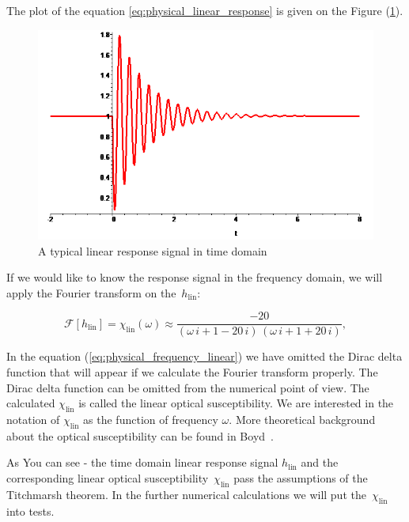 \documentclass[12pt,twoside,a4paper]{article}
\numberwithin{equation}{subsection}
\numberwithin{figure}{subsection}
\begin{document}
The plot of the equation \ref{eq:physical_linear_response} is given on the Figure (\ref{fig:physical_linplot}).

\begin{figure}[H]
  \includegraphics[width=150mm]{img/lin_plot.png}
  \caption{A typical linear response signal in time domain \label{fig:physical_linplot}}
\end{figure}

If we would like to know the response signal in the frequency domain, we will apply the Fourier transform on the~$ h_{\text{lin}} $:

\begin{equation} \label{eq:physical_frequency_linear}
  \mathcal{F}[h_{\text{lin}}] = \chi_{\text{lin}}(\omega) \approx \frac{ -20}{(\omega \,i + 1 -20\,i)\,(\omega \,i + 1 + 20\,i)},
\end{equation}

In the equation (\ref{eq:physical_frequency_linear}) we have omitted the Dirac delta function that will appear if we calculate the Fourier
transform properly. The Dirac delta function can be omitted from the numerical point of view. The calculated $ \chi_{\text{lin}} $
is called the linear optical susceptibility. We are interested in the notation of $ \chi_{\text{lin}} $ as the function of frequency
$ \omega $. More theoretical background about the optical susceptibility can be found in Boyd~\cite{boyd_nlo}. 

As You can see - the time domain linear response signal $ h_{\text{lin}} $ and the corresponding linear optical susceptibility~$
\chi_{\text{lin}} $ pass the assumptions of the Titchmarsh theorem. In the further numerical calculations we will put the~$
\chi_{\text{lin}} $ into tests. 
\end{document}
